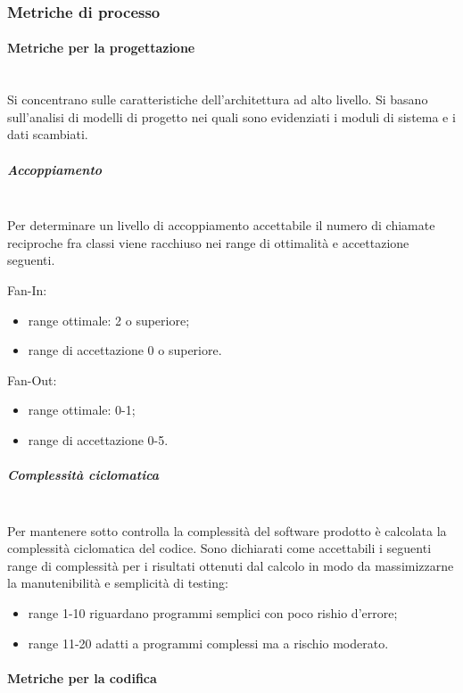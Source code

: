 \subsubsection{Metriche di processo}\label{sec:metriche_processo}

\paragraph{Metriche per la progettazione}\mbox{}\\
Si concentrano sulle caratteristiche dell'architettura ad alto livello. Si basano sull'analisi di modelli di progetto nei quali sono evidenziati i moduli di sistema e i dati scambiati.

\subparagraph{Accoppiamento}\mbox{}\\
Per determinare un livello di accoppiamento accettabile il numero di chiamate reciproche fra classi viene racchiuso nei range di ottimalità e accettazione seguenti.

Fan-In:
\begin{itemize}
	\item range ottimale: 2 o superiore;
	\item range di accettazione 0 o superiore.
\end{itemize}

Fan-Out:
\begin{itemize}
	\item range ottimale: 0-1;
	\item range di accettazione 0-5.
\end{itemize}

\subparagraph{Complessità ciclomatica}\mbox{}\\
Per mantenere sotto controlla la complessità del software prodotto è calcolata la complessità ciclomatica del codice. 
Sono dichiarati come accettabili i seguenti range di complessità per i risultati ottenuti dal calcolo in modo da massimizzarne la manutenibilità e semplicità di testing: 
\begin{itemize}
	\item range 1-10 riguardano programmi semplici con poco rishio d'errore;
	\item range 11-20 adatti a programmi complessi ma a rischio moderato.
\end{itemize}

\paragraph{Metriche per la codifica}\mbox{}

